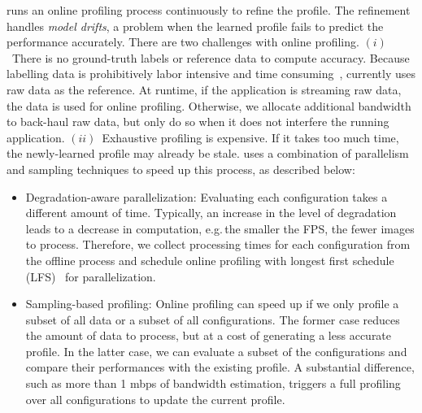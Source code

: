 
 \sysname{} runs an online profiling process
continuously to refine the profile. The refinement handles \textit{model
  drifts}, a problem when the learned profile fails to predict the performance
accurately. There are two challenges with online profiling.  $(i)$~There is no
ground-truth labels or reference data to compute accuracy. Because labelling
data is prohibitively labor intensive and time
consuming~\cite{russell2008labelme}, \sysname{} currently uses raw data as the
reference. At runtime, if the application is streaming raw data, the data is
used for online profiling. Otherwise, we allocate additional bandwidth to
back-haul raw data, but only do so when it does not interfere the running
application.  $(ii)$~Exhaustive profiling is expensive. If it takes too much
time, the newly-learned profile may already be stale. \sysname{} uses a
combination of parallelism and sampling techniques to speed up this process, as
described below:

\begin{itemize}[leftmargin=*, topsep=0pt, itemsep=0pt]

\item Degradation-aware parallelization: Evaluating each configuration takes a
  different amount of time. Typically, an increase in the level of degradation
  leads to a decrease in computation, e.g.\,the smaller the FPS, the fewer
  images to process. Therefore, we collect processing times for each
  configuration from the offline process and schedule online profiling with
  longest first schedule (LFS)~\cite{karger2010scheduling} for parallelization.

\item Sampling-based profiling: Online profiling can speed up if we only profile
  a subset of all data or a subset of all configurations.  The former case
  reduces the amount of data to process, but at a cost of generating a less
  accurate profile. In the latter case, we can evaluate a subset of the
  configurations and compare their performances with the existing profile. A
  substantial difference, such as more than 1 mbps of bandwidth estimation,
  triggers a full profiling over all configurations to update the current
  profile.

\end{itemize}

